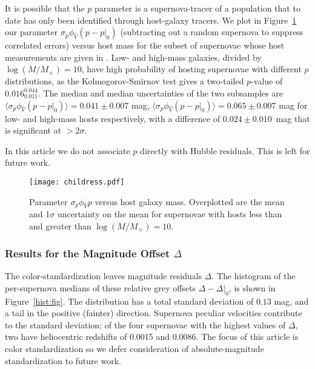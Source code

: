 \documentclass[trackchanges]{aastex62}   	%
\begin{document}
It is possible that the  $p$ parameter is a supernova-tracer of a population that to date has only been identified through host-galaxy tracers.
We plot in Figure~\ref{childress3:fig} our parameter
 $\sigma_p\phi_{\hat{V}}(p-p|_0) $  (subtracting out a random supernova
to suppress correlated errors) versus host mass
for the subset of supernovae whose host measurements are given in \citet{2013ApJ...770..108C}.
Low- and high-mass galaxies, divided by $\log{(M/M_\sun)}=10$, have high probability of hosting supernovae with different $p$ distributions, as
the Kolmogorov-Smirnov test gives a two-tailed $p$-value of $  0.016 _ {     0.011 } ^{     0.044 }$.
The median and median uncertainties of the two subsamples are
$\langle \sigma_p\phi_{\hat{V}}(p-p|_0) \rangle=  0.041 \pm {     0.007 }$ mag,
$\langle \sigma_p\phi_{\hat{V}}(p-p|_0)  \rangle=0.065 \pm {     0.007 }$ mag
for low- and high-mass hosts respectively, with a difference of $ 0.024 \pm {     0.010 }$~mag that is significant at $>2 \sigma$.

In this article we do not associate $p$ directly with Hubble residuals. This is left for future work.

\begin{figure}[htbp] %
   \centering
   \texttt{[image: childress.pdf]} 
   \caption{Parameter $\sigma_p\phi_{\hat{V}}p$  versus host galaxy mass. Overplotted are the mean and 1$\sigma$ uncertainty on the mean for supernovae with hosts
      less than and greater than  $\log{(M/M_\sun)}=10$.
    \label{childress3:fig}}
\end{figure}


\subsubsection{Results for the Magnitude Offset $\Delta$}
\label{Delta:sec}

The color-standardization leaves magnitude residuals $\Delta$.
The histogram of the per-supernova  medians of these relative  grey offsets $\Delta-\Delta|_0$,
is shown in Figure~\ref{hist:fig}.  The distribution
has a total standard deviation of
$0.13$
mag, and a tail in the positive (fainter) direction.
Supernova peculiar velocities contribute to the standard deviation; of the four
supernovae with the highest values of $\Delta$, two have 
heliocentric
redshifts of 0.0015 and 0.0086. 
The focus of this article is color standardization so we defer consideration of absolute-magnitude standardization to future work.
 
\end{document}
